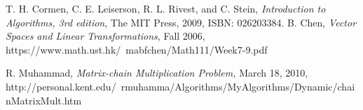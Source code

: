 \documentclass[letterpaper,titlepage]{article}
\begin{document}
\begin{thebibliography}{1}
   T. H. Cormen, C. E. Leiserson, R. L. Rivest, and C. Stein, {\em Introduction to Algorithms, 3rd edition}, The MIT Press, 2009, ISBN: 026203384.
   B. Chen, {\em Vector Spaces and Linear Transformations}, Fall 2006, https://www.math.ust.hk/~mabfchen/Math111/Week7-9.pdf
  
   R. Muhammad, { \em Matrix-chain Multiplication Problem,} March 18, 2010, http://personal.kent.edu/~rmuhamma/Algorithms/MyAlgorithms/Dynamic/chainMatrixMult.htm
\end{thebibliography}
  
\end{document}
